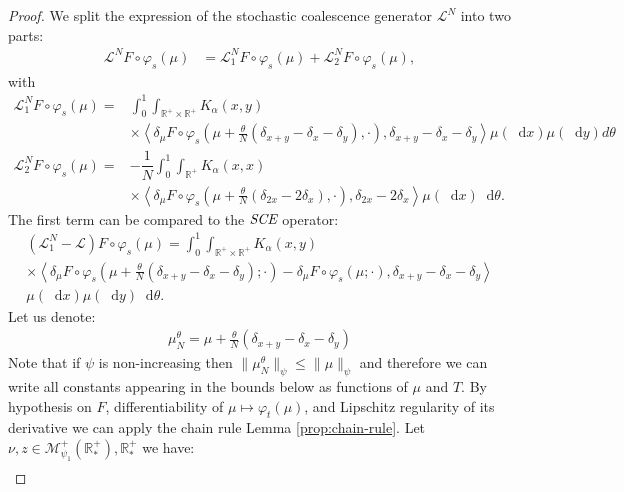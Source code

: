 \documentclass[11pt,a4paper]{article}
\newcommand{\RR}{\mathbb{R}}
\newcommand{\RRP}{\mathbb{R}^+_*}
\newcommand{\MC}{\mathcal{M}}
\newcommand{\LC}{\mathcal{L}}
\newcommand{\SCE}{\emph{SCE}}
\newcommand{\dd}{\mathop{}\!\mathrm{d}}
\begin{document}
\begin{proof}
    We split the expression of the stochastic coalescence generator $\LC^N$ into two parts:
    \begin{align*}
        \LC^N F\circ \varphi_s(\mu) &= \LC_1^N F\circ \varphi_s(\mu) + \LC_2^N F\circ \varphi_s(\mu),
    \end{align*}
    with
    \begin{align*}
            \LC_1^N F\circ \varphi_s(\mu) =& \int_0^1 \int_{\RR^+ \times \RR^+} K_{\alpha}(x,y) \\
            &\times \left\langle  \delta_\mu F\circ \varphi_s\left(\mu + \frac{\theta}{N}\left(\delta_{x + y} - \delta_x - \delta_y \right),\cdot\right),\delta_{x+y} - \delta_x - \delta_y\right\rangle\mu(\dd x)\mu(\dd y)d\theta \\
            \LC_2^N F\circ \varphi_s(\mu) =& -\dfrac{1}{N}\int_0^1\int_{\RR^+} K_{\alpha}(x,x) \\
            &\times \left\langle  \delta_\mu F\circ \varphi_s\left(\mu + \frac{\theta}{N}\left(\delta_{2x} - 2\delta_x \right),\cdot\right),\delta_{2x} - 2\delta_x \right\rangle\mu(\dd x)\dd\theta.
    \end{align*}
    The first term can be compared to the $\SCE$ operator:
    \begin{multline*}
        \left(\LC_1^N - \LC\right)F\circ \varphi_s (\mu) 
        = \int_0^1 \int_{\RR^+ \times \RR^+} K_{\alpha}(x,y)\\
        \times  \left\langle  \delta_\mu F\circ \varphi_s\left(\mu + \frac{\theta}{N}\left(\delta_{x + y} - \delta_x - \delta_y \right);\cdot\right)- \delta_\mu F\circ \varphi_s\left(\mu;\cdot\right),\delta_{x+y} - \delta_x - \delta_y\right\rangle \\
        \mu(\dd x)\mu(\dd y)\dd \theta .
    \end{multline*}
    Let us denote:
    \begin{align*}
        \mu^\theta_N = \mu + \frac{\theta}{N}\left(\delta_{x + y} - \delta_x - \delta_y \right)
    \end{align*}
    Note that if $\psi$ is non-increasing then $\|\mu^\theta_N\|_{\psi} \leq \|\mu\|_{\psi}$ and therefore we can write all constants appearing in the bounds below as functions of $\mu$ and $T$. By hypothesis on $F$, differentiability of $\mu \mapsto \varphi_t(\mu)$, and Lipschitz regularity of its derivative we can apply the chain rule Lemma \ref{prop:chain-rule}. Let $\nu,z \in \MC^+_{\psi_1}(\RRP),\RRP$ we have:
    \begin{align*}

\end{align*}
\end{proof}
\end{document}
